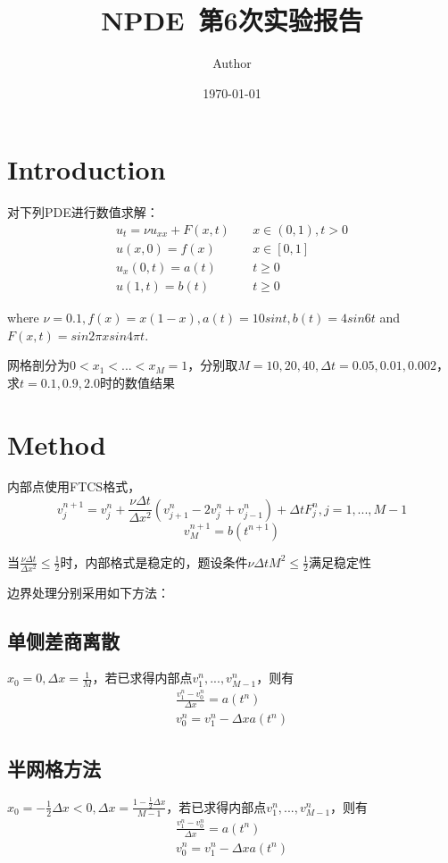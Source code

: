 \documentclass{article}
\title{NPDE~第6次实验报告}
\author{Author}
\date{\today}
\begin{document}
\maketitle

\section{Introduction}
对下列PDE进行数值求解：
\begin{equation*}
    \begin{aligned}
        u_t=\nu u_{xx}+F(x,t)&\quad x\in (0,1),t>0\\
        u(x,0)=f(x)&\quad x\in [0,1]\\
        u_x(0,t)=a(t)&\quad t\geq 0\\
        u(1,t)=b(t)&\quad t\geq 0
    \end{aligned}
\end{equation*}

where $\nu = 0.1, f(x) = x(1 - x), a(t) = 10 sin t, b(t) = 4sin 6t$ and $ F(x, t) =
sin 2\pi x sin 4\pi t$.

网格剖分为$0<x_1<...<x_M=1$，分别取$M=10,20,40,\Delta t=0.05,0.01,0.002$，求$t=0.1,0.9,2.0$时的数值结果
\section{Method}
内部点使用FTCS格式，
$$v_{j}^{n+1} = v_{j}^{n} + \frac{\nu \Delta t}{\Delta x^2}(v_{j+1}^{n} - 2v_{j}^{n} + v_{j-1}^{n}) + \Delta t F_{j}^{n}, j=1,...,M-1$$
$$v_M^{n+1} = b(t^{n+1})$$

当$\frac{\nu\Delta t}{\Delta x^2}\leq \frac{1}{2}$时，内部格式是稳定的，题设条件$\nu\Delta t M^2\leq \frac{1}{2}$满足稳定性

边界处理分别采用如下方法：
\subsection{单侧差商离散}
$x_0=0, \Delta x=\frac{1}{M}$，若已求得内部点$v_1^n,...,v_{M-1}^n$，则有
\begin{equation*}
    \begin{aligned}
        \frac{v_1^n-v_0^n}{\Delta x}=a(t^n)\\
        v_0^n=v_1^n-\Delta x a(t^n)
    \end{aligned}
\end{equation*}
\subsection{半网格方法}
$x_0=-\frac{1}{2}\Delta x<0, \Delta x=\frac{1-\frac{1}{2}\Delta x}{M-1}$，若已求得内部点$v_1^n,...,v_{M-1}^n$，则有
\begin{equation*}
    \begin{aligned}
        \frac{v_1^n-v_0^n}{\Delta x}=a(t^n)\\
        v_0^n=v_1^n-\Delta x a(t^n)
    \end{aligned}
\end{equation*}
\end{document}
